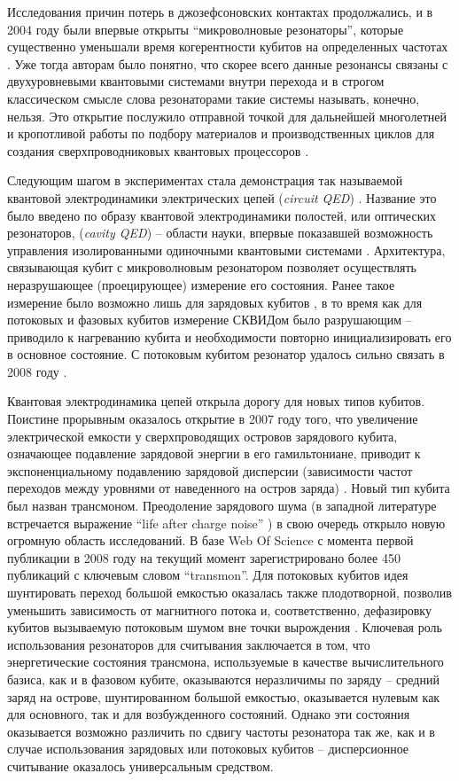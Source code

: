 \documentclass[14pt, a4paper]{extreport}
\numberwithin{equation}{section}
\begin{document}
Исследования причин потерь в джозефсоновских контактах продолжались, и в 2004 году были впервые открыты ``микроволновые резонаторы'', которые существенно уменьшали время когерентности кубитов на определенных частотах \cite{simmonds2004decoherence}. Уже тогда авторам было понятно, что скорее всего данные резонансы связаны с двухуровневыми квантовыми системами внутри перехода и в строгом классическом смысле слова резонаторами такие системы называть, конечно, нельзя. Это открытие послужило отправной точкой для дальнейшей многолетней и кропотливой работы по подбору материалов и производственных циклов для создания сверхпроводниковых квантовых процессоров \cite{barends2013coherent}.

Следующим шагом в экспериментах стала демонстрация так называемой квантовой электродинамики электрических цепей (\textit{circuit QED}) \cite{blais2004cavity, wallraff2004strong}. Название это было введено по образу квантовой электродинамики полостей, или оптических резонаторов, (\textit{cavity QED}) -- области науки, впервые показавшей возможность управления изолированными одиночными квантовыми системами \cite{mabuchi2002cavity}. Архитектура, связывающая кубит с микроволновым резонатором позволяет осуществлять неразрушающее (проецирующее) измерение его состояния. Ранее такое измерение было возможно лишь для зарядовых кубитов \cite{lehnert2003measurement}, в то время как для потоковых и фазовых кубитов измерение СКВИДом было разрушающим -- приводило к нагреванию кубита и необходимости повторно инициализировать его в основное состояние. С потоковым кубитом резонатор удалось сильно связать в 2008 году \cite{abdumalikov2008vacuum}.

Квантовая электродинамика цепей открыла дорогу для новых типов кубитов. Поистине прорывным оказалось открытие в 2007 году того, что увеличение электрической емкости у сверхпроводящих островов зарядового кубита, означающее подавление зарядовой энергии в его гамильтониане, приводит к экспоненциальному подавлению зарядовой дисперсии (зависимости частот переходов между уровнями от наведенного на остров заряда) \cite{koch2007charge}. Новый тип кубита был назван трансмоном. Преодоление зарядового шума (в западной литературе встречается выражение ``life after charge noise'' \cite{houck2009life}) в свою очередь открыло новую огромную область исследований. В базе Web Of Science с момента первой публикации в 2008 году на текущий момент зарегистрировано более 450 публикаций с ключевым словом ``transmon''. Для потоковых кубитов идея шунтировать переход большой емкостью оказалась также плодотворной, позволив уменьшить зависимость от магнитного потока и, соответственно, дефазировку кубитов вызываемую потоковым шумом вне точки вырождения \cite{you2007low, yan2016flux}. Ключевая роль использования резонаторов для считывания заключается в том, что энергетические состояния трансмона, используемые в качестве вычислительного базиса, как и в фазовом кубите, оказываются неразличимы по заряду -- средний заряд на острове, шунтированном большой емкостью, оказывается нулевым как для основного, так и для возбужденного состояний. Однако эти состояния оказывается возможно различить по сдвигу частоты резонатора так же, как и в случае использования зарядовых или потоковых кубитов -- дисперсионное считывание оказалось универсальным средством.
\end{document}
